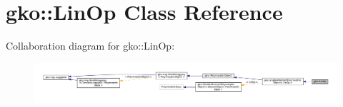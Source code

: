 \hypertarget{classgko_1_1LinOp}{}\section{gko\+:\+:Lin\+Op Class Reference}
\label{classgko_1_1LinOp}


Collaboration diagram for gko\+:\+:Lin\+Op\+:
\nopagebreak
\begin{figure}[H]
\begin{center}
\leavevmode
\includegraphics[width=350pt]{classgko_1_1LinOp__coll__graph}
\end{center}
\end{figure}
